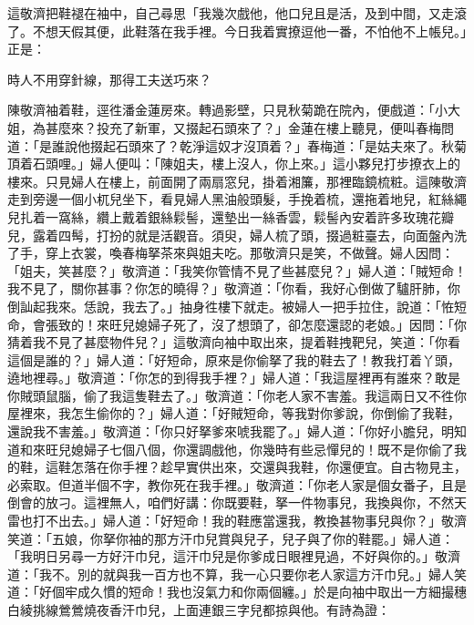 這敬濟把鞋褪在袖中，自己尋思「我幾次戲他，他口兒且是活，及到中間，又走滾了。不想天假其便，此鞋落在我手裡。今日我着實撩逗他一番，不怕他不上帳兒。」正是：

\begin{myquote}
時人不用穿針線，那得工夫送巧來？
\end{myquote}

陳敬濟袖着鞋，逕徃潘金蓮房來。轉過影壁，只見秋菊跪在院內，便戲道：「小大姐，為甚麼來？投充了新軍，又掇起石頭來了？」{}金蓮在樓上聽見，便叫春梅問道：「是誰說他掇起石頭來了？乾淨這奴才沒頂着？」春梅道：「是姑夫來了。秋菊頂着石頭哩。」婦人便叫：「陳姐夫，樓上沒人，{}你上來。」這小夥兒打步撩衣上的樓來。只見婦人在樓上，前面開了兩扇窓兒，掛着湘簾，那裡臨鏡梳粧。這陳敬濟走到旁邊一個小杌兒坐下，看見婦人黑油般頭髮，手挽着梳，還拖着地兒，紅絲繩兒扎着一窩絲，纘上戴着銀絲鬏髻，還墊出一絲香雲，鬏髻內安着許多玫瑰花瓣兒，露着四髩，打扮的就是活觀音。{}須臾，婦人梳了頭，掇過粧臺去，向面盤內洗了手，穿上衣裳，喚春梅拏茶來與姐夫吃。那敬濟只是笑，不做聲。{}婦人因問：「姐夫，笑甚麼？」敬濟道：「我笑你管情不見了些甚麼兒？」婦人道：「賊短命！我不見了，關你甚事？你怎的曉得？」敬濟道：「你看，我好心倒做了驢肝肺，你倒訕起我來。恁說，我去了。」抽身徃樓下就走。被婦人一把手拉住，說道：「恠短命，會張致的！來旺兒媳婦子死了，沒了想頭了，卻怎麼還認的老娘。」{}因問：「你猜着我不見了甚麼物件兒？」這敬濟向袖中取出來，提着鞋拽靶兒，笑道：「你看這個是誰的？」婦人道：「好短命，原來是你偷拏了我的鞋去了！教我打着丫頭，遶地裡尋。」敬濟道：「你怎的到得我手裡？」婦人道：「我這屋裡再有誰來？敢是你賊頭鼠腦，偷了我這隻鞋去了。」敬濟道：「你老人家不害羞。我這兩日又不徃你屋裡來，我怎生偷你的？」婦人道：「好賊短命，等我對你爹說，你倒偷了我鞋，還說我不害羞。」敬濟道：「你只好拏爹來唬我罷了。」婦人道：「你好小膽兒，明知道和來旺兒媳婦子七個八個，你還調戲他，你幾時有些忌憚兒的！既不是你偷了我的鞋，這鞋怎落在你手裡？趁早實供出來，交還與我鞋，你還便宜。自古物見主，必索取。但道半個不字，教你死在我手裡。」敬濟道：「你老人家是個女番子，且是倒會的放刁。這裡無人，咱們好講：你既要鞋，拏一件物事兒，我換與你，不然天雷也打不出去。」婦人道：「好短命！我的鞋應當還我，教換甚物事兒與你？」敬濟笑道：「五娘，你拏你袖的那方汗巾兒賞與兒子，兒子與了你的鞋罷。」{}婦人道：「我明日另尋一方好汗巾兒，這汗巾兒是你爹成日眼裡見過，不好與你的。」敬濟道：「我不。別的就與我一百方也不算，我一心只要你老人家這方汗巾兒。」婦人笑道：「好個牢成久慣的短命！我也沒氣力和你兩個纏。」於是向袖中取出一方細撮穗白綾挑線鶯鶯燒夜香汗巾兒，上面連銀三字兒都掠與他。有詩為證：

